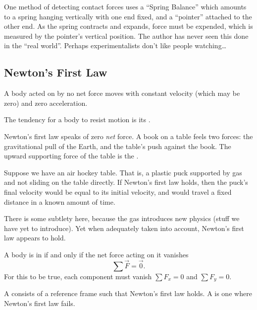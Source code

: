 One method of detecting contact forces uses a ``Spring Balance''%
which amounts to a spring hanging vertically with one end fixed, and a
``pointer'' attached to the other end. As the spring contracts and
expands, force must be expended, which is measured by the pointer's
vertical position. The author has never seen this done in the ``real world''.
Perhaps experimentalists don't like people watching\dots

\subsection{Newton's First Law}

\label{law:newton:first}
A body acted on by no net force moves with constant velocity
(which may be zero) and zero acceleration.

\begin{defn}
The tendency for a body to resist motion is its .
\end{defn}

\M
Newton's first law speaks of zero \emph{net} force. A book on a table
feels two forces: the gravitational pull of the Earth, and the table's
push against the book. The upward supporting force of the table is the
.

Suppose we have an air hockey table. That is, a plastic puck supported
by gas and not sliding on the table directly. If Newton's first law
holds, then the puck's final velocity would be equal to its initial
velocity, and would travel a fixed distance in a known amount of time.

There is some subtlety here, because the gas introduces new physics
(stuff we have yet to introduce). Yet when adequately taken into
account, Newton's first law appears to hold.

\begin{defn}
A body is in  if and only if the net force acting on
it vanishes
\begin{equation}
  \sum\vec{F} = \vec{0}.
\end{equation}
For this to be true, each component must vanish $\sum F_{x}=0$ and $\sum
F_{y}=0$. 
\end{defn}

\begin{defn}
A  consists of a reference frame such
that Newton's first law holds. A 
is one where Newton's first law fails.
\end{defn}

